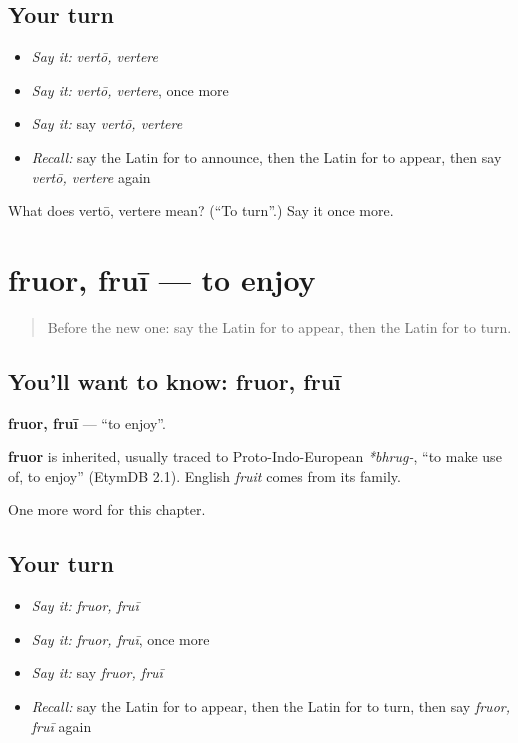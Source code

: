 \subsection*{Your turn}
\begin{itemize}
\raggedright
  \item \emph{Say it:} \emph{vertō, vertere}
  \item \emph{Say it:} \emph{vertō, vertere}, once more
  \item \emph{Say it:} say \emph{vertō, vertere}
  \item \emph{Recall:} say the Latin for to announce, then the Latin for to appear, then say \emph{vertō, vertere} again
\end{itemize}

\begin{tcolorbox}[breakable,colback=teal!4,colframe=teal!35!black,title={Before you move on}]
What does vertō, vertere mean? (\textquotedblleft{}To turn\textquotedblright{}.) Say it once more.
\end{tcolorbox}
\section[fruor, fruī]{fruor, fruī — to enjoy}

\label{lesson:LA-C231-fruor}



\begin{quote}
Before the new one: say the Latin for to appear, then the Latin for to turn.
\end{quote}

\subsection*{You'll want to know: fruor, fruī}
\textbf{fruor, fruī} — \textquotedblleft{}to enjoy\textquotedblright{}.

\begin{cousinweb}
\textbf{fruor} is inherited, usually traced to Proto-Indo-European \emph{*bhrug-}, \textquotedblleft{}to make use of, to enjoy\textquotedblright{} (EtymDB 2.1). English \emph{fruit} comes from its family.
\end{cousinweb}

\begin{grammarlens}[title={What you've built}]
One more word for this chapter.
\end{grammarlens}

\subsection*{Your turn}
\begin{itemize}
\raggedright
  \item \emph{Say it:} \emph{fruor, fruī}
  \item \emph{Say it:} \emph{fruor, fruī}, once more
  \item \emph{Say it:} say \emph{fruor, fruī}
  \item \emph{Recall:} say the Latin for to appear, then the Latin for to turn, then say \emph{fruor, fruī} again
\end{itemize}

